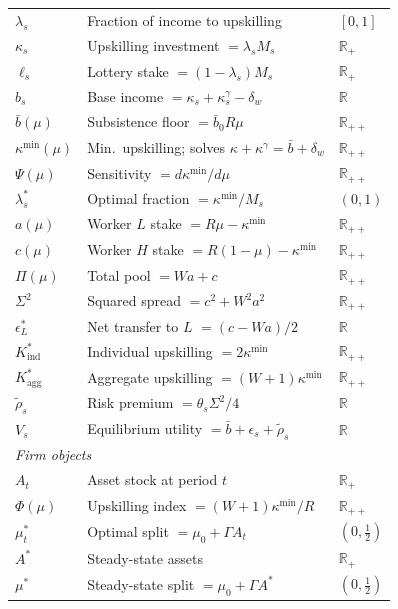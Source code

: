 \documentclass[12pt,a4paper]{article}
\begin{document}
\begin{table}[h!]
\begin{tabular}{lp{8.2cm}l}
$\lambda_s$ & Fraction of income to upskilling & $[0,1]$ \\
$\kappa_s$ & Upskilling investment $=\lambda_s M_s$ & $\mathbb{R}_+$ \\
$\ell_s$ & Lottery stake $=(1-\lambda_s)M_s$ & $\mathbb{R}_+$ \\
$b_s$ & Base income $=\kappa_s+\kappa_s^\gamma-\delta_w$ & $\mathbb{R}$ \\
$\bar{b}(\mu)$ & Subsistence floor $=\bar{b}_0R\mu$ & $\mathbb{R}_{++}$ \\
$\kappa^{\min}(\mu)$ & Min.\ upskilling; solves $\kappa+\kappa^\gamma=\bar{b}+\delta_w$ & $\mathbb{R}_{++}$ \\
$\Psi(\mu)$ & Sensitivity $=d\kappa^{\min}/d\mu$ & $\mathbb{R}_{++}$ \\
$\lambda_s^*$ & Optimal fraction $=\kappa^{\min}/M_s$ & $(0,1)$ \\
$a(\mu)$ & Worker $L$ stake $=R\mu-\kappa^{\min}$ & $\mathbb{R}_{++}$ \\
$c(\mu)$ & Worker $H$ stake $=R(1-\mu)-\kappa^{\min}$ & $\mathbb{R}_{++}$ \\
$\Pi(\mu)$ & Total pool $=Wa+c$ & $\mathbb{R}_{++}$ \\
$\Sigma^2$ & Squared spread $=c^2+W^2a^2$ & $\mathbb{R}_{++}$ \\
$\epsilon_L^*$ & Net transfer to $L$ $=(c-Wa)/2$ & $\mathbb{R}$ \\
$K^*_{\mathrm{ind}}$ & Individual upskilling $=2\kappa^{\min}$ & $\mathbb{R}_{++}$ \\
$K^*_{\mathrm{agg}}$ & Aggregate upskilling $=(W+1)\kappa^{\min}$ & $\mathbb{R}_{++}$ \\
$\tilde\rho_s$ & Risk premium $=\theta_s\Sigma^2/4$ & $\mathbb{R}$ \\
$V_s$ & Equilibrium utility $=\bar{b}+\epsilon_s+\tilde\rho_s$ & $\mathbb{R}$ \\
\midrule
\multicolumn{3}{l}{\textit{Firm objects}} \\
$A_t$ & Asset stock at period $t$ & $\mathbb{R}_+$ \\
$\Phi(\mu)$ & Upskilling index $=(W+1)\kappa^{\min}/R$ & $\mathbb{R}_{++}$ \\
$\mu_t^*$ & Optimal split $=\mu_0+\Gamma A_t$ & $(0,\tfrac{1}{2})$ \\
$A^*$ & Steady-state assets & $\mathbb{R}_+$ \\
$\mu^*$ & Steady-state split $=\mu_0+\Gamma A^*$ & $(0,\tfrac{1}{2})$ \\
\bottomrule
\end{tabular}
\end{table}
\end{document}

